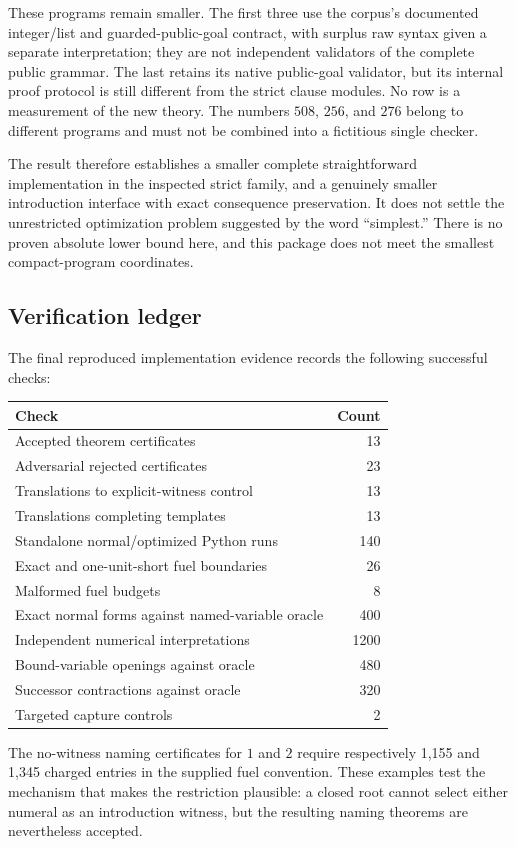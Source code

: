 \documentclass[11pt]{article}
\theoremstyle{definition}\newtheorem{definition}[theorem]{Definition}
\theoremstyle{remark}\newtheorem{remark}[theorem]{Remark}
\begin{document}
These programs remain smaller. The first three use the corpus's documented
integer/list and guarded-public-goal contract, with surplus raw syntax
given a separate interpretation; they are not independent validators of
the complete public grammar. The last retains its native public-goal
validator, but its internal proof protocol is still different from the
strict clause modules. No row is a measurement of the new theory.
The numbers $508$, $256$, and $276$ belong to different programs and
must not be combined into a fictitious single checker.

The result therefore establishes a smaller complete straightforward
implementation in the inspected strict family, and a genuinely smaller
introduction interface with exact consequence preservation. It does not
settle the unrestricted optimization problem suggested by the word
``simplest.'' There is no proven absolute lower bound here, and this
package does not meet the smallest compact-program coordinates.

\subsection{Verification ledger}

The final reproduced implementation evidence records the following
successful checks:
\begin{center}
\begin{tabular}{lr}
\toprule
Check & Count\\
\midrule
Accepted theorem certificates &13\\
Adversarial rejected certificates &23\\
Translations to explicit-witness control &13\\
Translations completing templates &13\\
Standalone normal/optimized Python runs &140\\
Exact and one-unit-short fuel boundaries &26\\
Malformed fuel budgets &8\\
Exact normal forms against named-variable oracle &400\\
Independent numerical interpretations &1200\\
Bound-variable openings against oracle &480\\
Successor contractions against oracle &320\\
Targeted capture controls &2\\
\bottomrule
\end{tabular}
\end{center}
The no-witness naming certificates for $1$ and $2$ require respectively
1,155 and 1,345 charged entries in the supplied fuel convention. These
examples test the mechanism that makes the restriction plausible: a
closed root cannot select either numeral as an introduction witness,
but the resulting naming theorems are nevertheless accepted.
\end{document}
